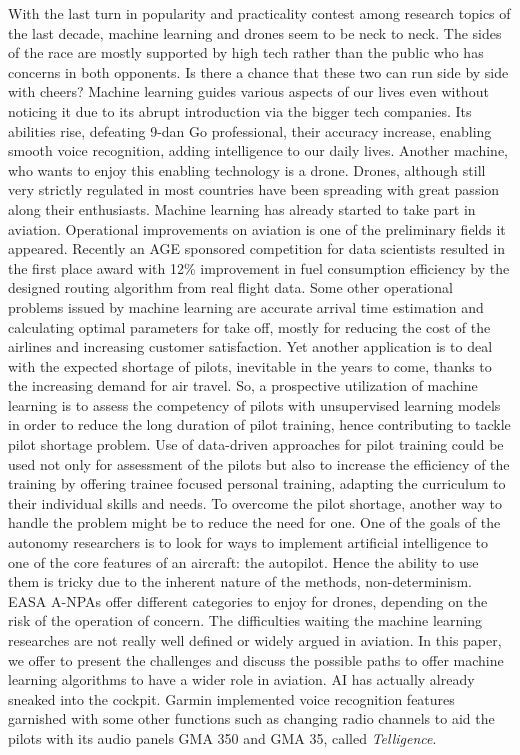 With the last turn in popularity and practicality contest among research topics of the last decade, machine learning and drones seem to be neck to neck. The sides of the race are mostly supported by high tech rather than the public who has concerns in both opponents. Is there a chance that these two can run side by side with cheers? Machine learning guides various aspects of our lives even without noticing it due to its abrupt introduction via the bigger tech companies. Its abilities rise, defeating 9-dan Go professional, their accuracy increase, enabling smooth voice recognition, adding intelligence to our daily lives. Another machine, who wants to enjoy this enabling technology is a drone. Drones, although still very strictly regulated in most countries have been spreading with great passion along their enthusiasts. Machine learning has already started to take part in aviation. Operational improvements on aviation is one of the preliminary fields it appeared. Recently an AGE sponsored competition for data scientists resulted in the first place award with 12\% improvement in fuel consumption efficiency by the designed routing algorithm from real flight data. Some other operational problems issued by machine learning are accurate arrival time estimation and calculating optimal parameters for take off, mostly for reducing the cost of the airlines and increasing customer satisfaction. Yet another application is to deal with the expected shortage of pilots, inevitable in the years to come, thanks to the increasing demand for air travel. So, a prospective utilization of machine learning is to assess the competency of pilots with unsupervised learning models in order to reduce the long duration of pilot training, hence contributing to tackle pilot shortage problem. Use of data-driven approaches for pilot training could be used not only for assessment of the pilots but also to increase the efficiency of the training by offering trainee focused personal training, adapting the curriculum to their individual skills and needs. To overcome the pilot shortage, another way to handle the problem might be to reduce the need for one. One of the goals of the autonomy researchers is to look for ways to implement artificial intelligence to one of the core features of an aircraft: the autopilot. Hence the ability to use them is tricky due to the inherent nature of the methods, non-determinism. EASA A-NPAs offer different categories to enjoy for drones, depending on the risk of the operation of concern. The difficulties waiting the machine learning researches are not really well defined or widely argued in aviation. In this paper, we offer to present the challenges and discuss the possible paths to offer machine learning algorithms to have a wider role in aviation. AI has actually already sneaked into the cockpit. Garmin implemented voice recognition features garnished with some other functions such as changing radio channels to aid the pilots with its audio panels GMA 350 and GMA 35, called \emph{Telligence}. 

